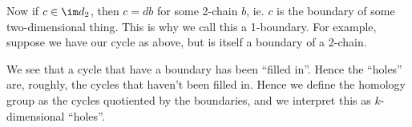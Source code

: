 \documentclass[a4paper]{article}
\begin{document}
Now if $c \in \im d_2$, then $c = db$ for some 2-chain $b$, ie. $c$ is the boundary of some two-dimensional thing. This is why we call this a 1-boundary. For example, suppose we have our cycle as above, but is itself a boundary of a 2-chain.
\begin{center}
\end{center}
We see that a cycle that have a boundary has been ``filled in''. Hence the ``holes'' are, roughly, the cycles that haven't been filled in. Hence we define the homology group as the cycles quotiented by the boundaries, and we interpret this as $k$-dimensional ``holes''.
\end{document}
